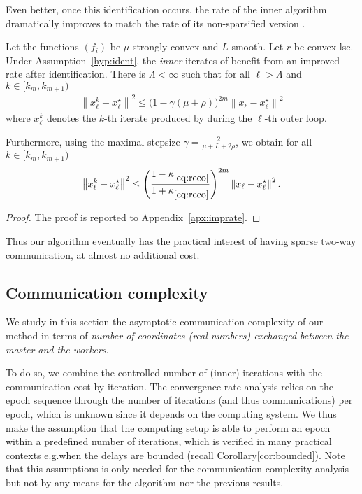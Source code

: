 Even better, once this identification occurs, the rate of the inner algorithm \salgo dramatically improves to match the rate of its non-sparsified version \dave.

\begin{theorem}\label{th:imprate}
Let the functions $(f_i)$ be $\mu$-strongly convex and $L$-smooth. Let $r$ be convex lsc. Under Assumption~\ref{hyp:ident}, the \emph{inner} iterates of \recoalgo benefit from an improved rate after identification. There is $\Lambda<\infty$ such that for all $\ell>\Lambda$ and  $k\in [k_m, k_{m+1})$
\begin{align*}
    \left\| x_\ell^k - x_\ell^\star \right\|^2 \le \Big(1 - \gamma (\mu+\rho)  \Big)^{2m} \left\|x_{\ell}-x_\ell^\star\right\|^2
\end{align*}
where $x^k_\ell$ denotes the $k$-th iterate produced by \salgo during the $\ell$-th outer loop.

Furthermore, using the maximal stepsize $\gamma = \frac{2}{\mu + L + 2\rho}$, we obtain for all $k\in [k_m, k_{m+1})$
\begin{align*}
    \left\| x_\ell^k - x_\ell^\star \right\|^2 \le \left( \frac{1-\kappa_{\eqref{eq:reco}}}{1+\kappa_{\eqref{eq:reco}}}  \right)^{2m} \left\|x_{\ell}-x_\ell^\star\right\|^2.
\end{align*}
\end{theorem}

\begin{proof}
    The proof is reported to Appendix~\ref{apx:imprate}.
\end{proof}

Thus our algorithm eventually has the practical interest of having sparse two-way communication, at almost no additional cost.

\subsection{Communication complexity}\label{sec:comm}

We study in this section the asymptotic communication complexity of our method in terms of \emph{number of coordinates (\emph{real} numbers) exchanged between the master and the workers}. 

To do so, we combine the controlled number of (inner) iterations with the communication cost by iteration. The convergence rate analysis relies on the epoch sequence through the number of iterations (and thus communications) per epoch, which is unknown since it depends on the computing system. We thus make the assumption that the computing setup is able to perform an epoch within a predefined number of iterations, which is verified in many practical contexts e.g.\;when the delays are bounded (recall Corollary\;\ref{cor:bounded}). Note that this assumptions is only needed for the communication complexity analysis but not by any means for the algorithm nor the previous results.


